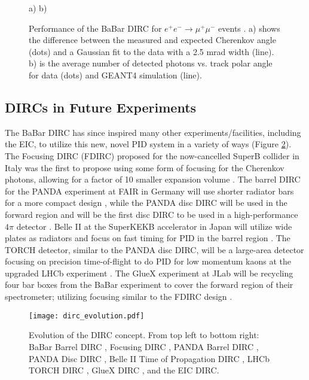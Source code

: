 \begin{figure}[!htb]
	\centering
	a)%
	b)%
	\caption[Performance of the BaBar DIRC for $e^{+}e^{-} \rightarrow \mu^{+}\mu^{-}$ events.]{Performance of the BaBar DIRC for $e^{+}e^{-} \rightarrow \mu^{+}\mu^{-}$ events \cite{BaBarDIRC}. a) shows the difference between the measured and expected Cherenkov angle (dots) and a Gaussian fit to the data with a 2.5 mrad width (line). b) is the average number of detected photons vs. track polar angle for data (dots) and GEANT4 \cite{GEANT4} simulation (line).}
	\label{fig:babarperformance}
\end{figure}

\subsection{DIRCs in Future Experiments}
The BaBar DIRC has since inspired many other experiments/facilities, including the EIC, to utilize this new, novel PID system in a variety of ways (Figure \ref{fig:dirc_evolution}). The Focusing DIRC (FDIRC) proposed for the now-cancelled SuperB collider in Italy was the first to propose using some form of focusing for the Cherenkov photons, allowing for a factor of 10 smaller expansion volume \cite{FDIRC} \cite{FDIRC2}. The barrel DIRC for the PANDA experiment at FAIR in Germany will use shorter radiator bars for a more compact design \cite{PANDA_barrel}, while the PANDA disc DIRC will be used in the forward region and will be the first disc DIRC to be used in a high-performance $4\pi$ detector \cite{PANDA_disc}. Belle II at the SuperKEKB accelerator in Japan will utilize wide plates as radiators and focus on fast timing for PID in the barrel region \cite{Belle2_TOP}. The TORCH detector, similar to the PANDA disc DIRC, will be a large-area detector focusing on precision time-of-flight to do PID for low momentum kaons at the upgraded LHCb experiment \cite{TORCH}. The GlueX experiment at JLab will be recycling four bar boxes from the BaBar experiment to cover the forward region of their spectrometer; utilizing  focusing similar to the FDIRC design \cite{GlueX}.

\begin{figure}[H]
	\centering
	\texttt{[image: dirc\_evolution.pdf]}
	\caption[Evolution of the DIRC concept.]{Evolution of the DIRC concept. From top left to bottom right: BaBar Barrel DIRC \cite{BaBarDIRC}, Focusing DIRC \cite{FDIRC2}, PANDA Barrel DIRC \cite{PANDA_barrel}, PANDA Disc DIRC \cite{PANDA_disc}, Belle II Time of Propagation DIRC \cite{Belle2_TOP}, LHCb TORCH DIRC \cite{TORCH}, GlueX DIRC \cite{GlueX}, and the EIC DIRC.}
	\label{fig:dirc_evolution}
\end{figure}


